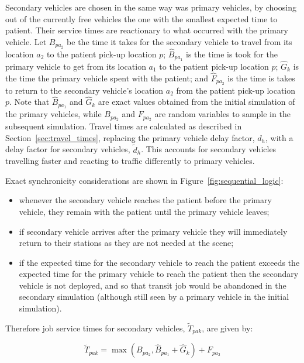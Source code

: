 \documentclass[preprint,12pt]{elsarticle}
\begin{document}
Secondary vehicles are chosen in the same way was primary vehicles, by choosing
out of the currently free vehicles the one with the smallest expected time to
patient. Their service times are reactionary to what occurred with the primary
vehicle.
Let $B_{pa_2}$ be the time it takes for the secondary vehicle to travel from
its location $a_2$ to the patient pick-up location $p$; $\hat{B}_{pa_1}$ is the
time is took for the primary vehicle to get from its location $a_1$ to the
patient pick-up location $p$; $\hat{G}_k$ is the time the primary vehicle spent
with the patient; and $\hat{F}_{pa_2}$ is the time is takes to return to the
secondary vehicle's location $a_2$ from the patient pick-up location $p$.
Note that $\hat{B}_{pa_1}$ and $\hat{G}_k$ are exact values obtained from the
initial simulation of the primary vehicles, while $B_{pa_2}$ and $F_{pa_2}$ are
random variables to sample in the subsequent simulation.
Travel times are calculated as described in Section~\ref{sec:travel_times},
replacing the primary vehicle delay factor, $d_h$, with a delay factor for
secondary vehicles, $\tilde{d}_h$. This accounts for secondary vehicles
travelling faster and reacting to traffic differently to primary vehicles.

Exact synchronicity considerations are shown in Figure~\ref{fig:sequential_logic}:
\begin{itemize}
  \item whenever the secondary vehicle reaches the patient before the primary
  vehicle, they remain with the patient until the primary vehicle leaves;
  \item if secondary vehicle arrives after the primary vehicle they will
  immediately return to their stations as they are not needed at the scene;
  \item if the expected time for the secondary vehicle to reach the patient
  exceeds the expected time for the primary vehicle to reach the patient then
  the secondary vehicle is not deployed, and so that transit job would be
  abandoned in the secondary simulation (although still seen by a primary
  vehicle in the initial simulation).
\end{itemize}

Therefore job service times for secondary vehicles, $\tilde{T}_{pak}$, are
given by:

\begin{equation}
  \tilde{T}_{pak} = \max\left(B_{pa_2}, \hat{B}_{pa_1} + \hat{G}_k \right) + F_{pa_2}
\end{equation}
\end{document}
